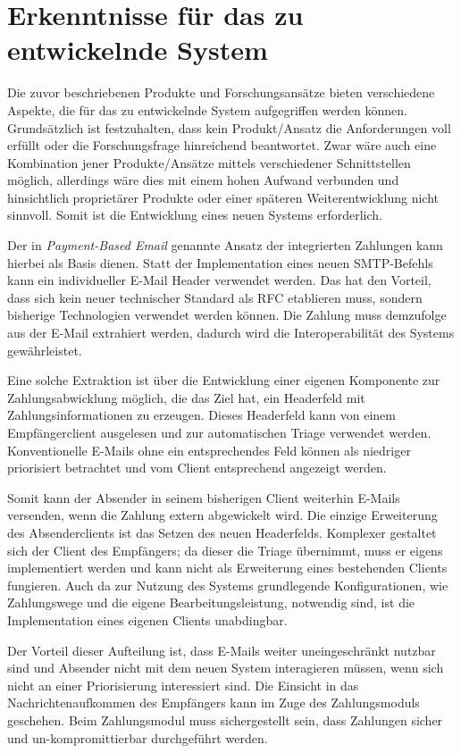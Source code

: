 
\section{Erkenntnisse für das zu entwickelnde System}
\label{Erkenntnisse_fuer_das_zu_entwickelnde_System}
Die zuvor beschriebenen Produkte und Forschungsansätze bieten verschiedene Aspekte, die für das zu entwickelnde System aufgegriffen werden können. Grundsätzlich ist festzuhalten, dass kein Produkt/Ansatz die Anforderungen voll erfüllt oder die Forschungsfrage hinreichend beantwortet. Zwar wäre auch eine Kombination jener Produkte/Ansätze mittels verschiedener Schnittstellen möglich, allerdings wäre dies mit einem hohen Aufwand verbunden und hinsichtlich proprietärer Produkte oder einer späteren Weiterentwicklung nicht sinnvoll. Somit ist die Entwicklung eines neuen Systems erforderlich.

Der in \textit{Payment-Based Email} genannte Ansatz der integrierten Zahlungen kann hierbei als Basis dienen. Statt der Implementation eines neuen SMTP-Befehls kann ein individueller E-Mail Header verwendet werden. Das hat den Vorteil, dass sich kein neuer technischer Standard als RFC etablieren muss, sondern bisherige Technologien verwendet werden können. Die Zahlung muss demzufolge aus der E-Mail extrahiert werden, dadurch wird die Interoperabilität des Systems gewährleistet. 

Eine solche Extraktion ist über die Entwicklung einer eigenen Komponente zur Zahlungsabwicklung möglich, die das Ziel hat, ein Headerfeld mit Zahlungsinformationen zu erzeugen. Dieses Headerfeld kann von einem Empfängerclient ausgelesen und zur automatischen Triage verwendet werden. Konventionelle E-Mails ohne ein entsprechendes Feld können als niedriger priorisiert betrachtet und vom Client entsprechend angezeigt werden.

Somit kann der Absender in seinem bisherigen Client weiterhin E-Mails versenden, wenn die Zahlung extern abgewickelt wird. Die einzige Erweiterung des Absenderclients ist das Setzen des neuen Headerfelds. Komplexer gestaltet sich der Client des Empfängers; da dieser die Triage übernimmt, muss er eigens implementiert werden und kann nicht als Erweiterung eines bestehenden Clients fungieren. Auch da zur Nutzung des Systems grundlegende Konfigurationen, wie Zahlungswege und die eigene Bearbeitungsleistung, notwendig sind, ist die Implementation eines eigenen Clients unabdingbar.

Der Vorteil dieser Aufteilung ist, dass E-Mails weiter uneingeschränkt nutzbar sind und Absender nicht mit dem neuen System interagieren müssen, wenn sich nicht an einer Priorisierung interessiert sind. Die Einsicht in das Nachrichtenaufkommen des Empfängers kann im Zuge des Zahlungsmoduls geschehen. Beim Zahlungsmodul muss sichergestellt sein, dass Zahlungen sicher und un-kompromittierbar durchgeführt werden.

